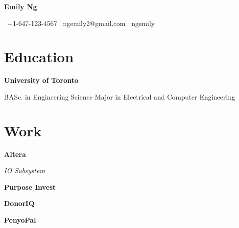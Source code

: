 \documentclass{article}
\makeatletter
\newcommand{\cvitem}[2]{\item[#1] \textbf{#2}}
\newcommand{\email}{\faEnvelope \, ngemily2@gmail.com }
\newcommand{\phone}{\faPhone \, +1-647-123-4567 }
\newcommand{\github}{\faGithub \, ngemily}
\makeatother
\begin{document}
{
\LARGE\bfseries Emily Ng \hrulefill
}

\phone \hfill \email \hfill \github

\section*{Education}

\begin{cvlist}
    \cvitem{2016}{University of Toronto}

        BASc. in Engineering Science Major in Electrical and Computer
        Engineering
\end{cvlist}

\section*{Work}

\begin{cvlist}
    \cvitem{2015}{Altera}

        \textit{IO Subsystem}

        
    \cvitem{2014}{Purpose Invest}

        
    \cvitem{2013}{DonorIQ}

        
    \cvitem{2012}{PenyoPal}

        
\end{cvlist}
\end{document}
